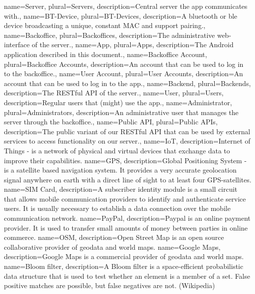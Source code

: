 {
	name=Server,
	plural=Servers,
	description={Central server the \gls{app} communicates with.},
}
{
	name=BT-Device,
	plural=BT-Devices,
	description={A \gls{bluetooth} or \gls{ble} device broadcasting a unique, constant \acrshort{MAC} and support pairing.},
}
{
	name=Backoffice,
	plural=Backoffices,
	description={The administrative web-interface of the \gls{server}.},
}
{
	name=App,
	plural=Apps,
	description={The Android application described in this document.},
}
{
	name=Backoffice Account,
	plural=Backoffice Accounts,
	description={An account that can be used to log in to the \gls{backoffice}.},
}
{
	name=User Account,
	plural=User Accounts,
	description={An account that can be used to log in to the \gls{app}.},
}
{
	name=Backend,
	plural=Backends,
	description={The RESTful API of the \gls{server}.},
}
{
	name=User,
	plural=Users,
	description={Regular users that (might) use the \gls{app}.},
}
{
	name=Administrator,
	plural=Administrators,
	description={An administrative user that manages the \gls{server} through the \gls{backoffice}.},
}
{
	name=Public API,
	plural=Public APIs,
	description={The public variant of our RESTful API that can be used by external services to access functionality on our \gls{server}.},
}
{
	name=IoT,
	description={Internet of Things - is a network of physical and virtual devices that exchange data to improve their capabilities.}
}
{
	name=GPS,
	description={Global Positioning System - is a satellite based navigation system. It provides a very accurate geolocation signal anywhere on earth with a direct line of sight to at least four GPS-satellites.}
}
{
	name=SIM Card,
	description={A subscriber identity module is a small circuit that allows mobile communication providers to identify and authenticate service users. It is usually necessary to establish a data connection over the mobile communication network.}
}
{
	name=PayPal,
	description={Paypal is an online payment provider. It is used to transfer small amounts of money between parties in online commerce. }
}
{
	name=OSM,
	description={Open Street Map is an open source collaborative provider of geodata and world maps.}
}
{
	name=Google Maps,
	description={Google Maps is a commercial provider of geodata and world maps.}
}
{
	name=Bloom filter,
	description={A Bloom filter is a space-efficient probabilistic data structure that is used to test whether an element is a member of a set. False positive matches are possible, but false negatives are not. (Wikipedia)}
}

\glsaddall
\makenoidxglossaries